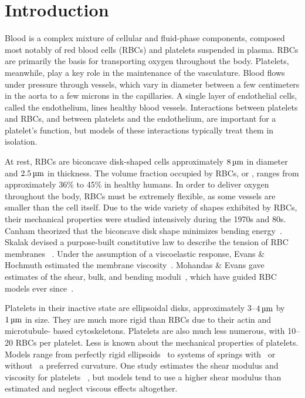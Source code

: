 \section{Introduction}

Blood is a complex mixture of cellular and fluid-phase components, composed most notably 
of red blood cells (RBCs) and platelets suspended in plasma. RBCs are primarily the basis
for transporting oxygen throughout the body. Platelets, meanwhile, play a key role in the
maintenance of the vasculature. Blood flows under pressure through vessels, which vary in
diameter between a few centimeters in the aorta to a few microns in the capillaries. A
single layer of endothelial cells, called the endothelium, lines healthy blood vessels.
Interactions between platelets and RBCs, and between platelets and the endothelium, are
important for a platelet's function, but models of these interactions typically treat
them in isolation.

At rest, RBCs are biconcave disk-shaped cells approximately $8\um$ in diameter and
$2.5\um$ in thickness. The volume fraction occupied by RBCs, or , ranges
from approximately 36\% to 45\% in healthy humans. In order to deliver oxygen throughout
the body, RBCs must be extremely flexible, as some vessels are smaller than the cell
itself. Due to the wide variety of shapes exhibited by RBCs, their mechanical properties
were studied intensively during the 1970s and 80s. Canham theorized that the biconcave
disk shape minimizes bending energy~\cite{Canham:1970wx}. Skalak  devised a
purpose-built constitutive law to describe the tension of RBC membranes~%
\cite{Skalak:1973tp}. Under the assumption of a viscoelastic response, Evans \& Hochmuth
estimated the membrane viscosity~\cite{Evans:1976tx}. Mohandas \& Evans gave estimates of
the shear, bulk, and bending moduli~\cite{Mohandas:1994tg}, which have guided RBC models
ever since~\cite{Pozrikidis:2003ft,Fai:2013do}.

Platelets in their inactive state are ellipsoidal disks, approximately 3--$4\um$ by
$1\um$ in size. They are much more rigid than RBCs due to their actin and microtubule-%
based cytoskeletons. Platelets are also much less numerous, with 10--20 RBCs per
platelet. Less is known about the mechanical properties of platelets. Models range from
perfectly rigid ellipsoids~\cite{Wang:2013gs} to systems of springs with~%
\cite{Erickson:2010ep,Skorczewski:2013jn} or without~\cite{Wu:2014gt} a preferred
curvature. One study estimates the shear modulus and viscosity for platelets~%
\cite{Haga:1998wa}, but models tend to use a higher shear modulus than estimated and
neglect viscous effects altogether.

